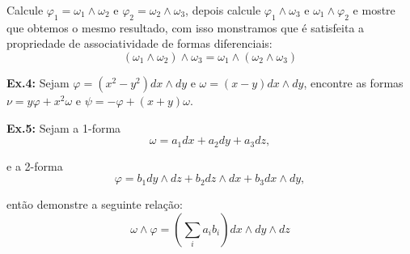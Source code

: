 Calcule $\varphi_1 = \omega_1\wedge\omega_2$ e $\varphi_2 = \omega_2\wedge\omega_3$, depois calcule $\varphi_1\wedge\omega_3$ e $\omega_1\wedge\varphi_2$ e mostre que obtemos o mesmo resultado, 
com isso monstramos que é satisfeita a propriedade de associatividade de formas diferenciais:
%
\[
(\omega_1\wedge\omega_2)\wedge\omega_3 
= \omega_1\wedge(\omega_2\wedge\omega_3)
\]

\noindent\textbf{Ex.4:} 
Sejam $\varphi = (x^2 - y^2) dx \wedge dy$ e $\omega = (x - y) dx \wedge dy$, encontre as formas $\nu = y \varphi + x^2\omega$ e $\psi = - \varphi + (x + y) \omega$.


\vspace{0.5cm}
\noindent\textbf{Ex.5:}
Sejam a 1-forma 
%
\begin{equation}
\nonumber \omega = a_1dx + a_2dy + a_3dz,
\end{equation}

e a 2-forma 
%
\begin{equation}
\nonumber  \varphi = b_1 dy\wedge dz + b_2 dz \wedge dx + b_3 dx \wedge dy,
\end{equation}

então demonstre a seguinte relação:
%
\[ 
\omega \wedge \varphi = \left(\sum_{i}a_i b_i\right)dx 
\wedge dy \wedge dz
\]





